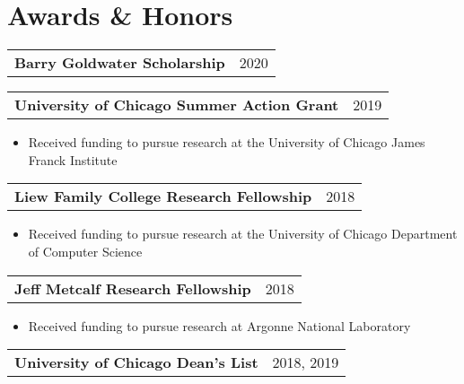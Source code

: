 \documentclass[letterpaper, 12pt]{article}
\begin{document}
\section{Awards \& Honors}
\vspace{5pt}

\begin{tabular}{@{} L{12cm} @{} R{4.51cm} @{}}
  \textbf{Barry Goldwater Scholarship} & 2020 \\
\end{tabular}
\vspace{3pt}

\begin{tabular}{@{} L{12cm} @{} R{4.51cm} @{}}
  \textbf{University of Chicago Summer Action Grant} & 2019 \\
\end{tabular}
\vspace{-20pt}
\begin{itemize}
  \item Received funding to pursue research at the University of Chicago James Franck Institute
\end{itemize}

\begin{tabular}{@{} L{12cm} @{} R{4.51cm} @{}}
  \textbf{Liew Family College Research Fellowship} & 2018 \\
\end{tabular}
\vspace{-20pt}
\begin{itemize}
  \item Received funding to pursue research at the University of Chicago Department of Computer Science
\end{itemize}

\begin{tabular}{@{} L{12cm} @{} R{4.51cm} @{}}
  \textbf{Jeff Metcalf Research Fellowship} & 2018 \\
\end{tabular}
\vspace{-20pt}
\begin{itemize}
  \item Received funding to pursue research at Argonne National Laboratory
\end{itemize}

\begin{tabular}{@{} L{12cm} @{} R{4.51cm} @{}}
  \textbf{University of Chicago Dean's List} & 2018, 2019 \\
\end{tabular}
\vspace{5pt}

\pagebreak
\end{document}
